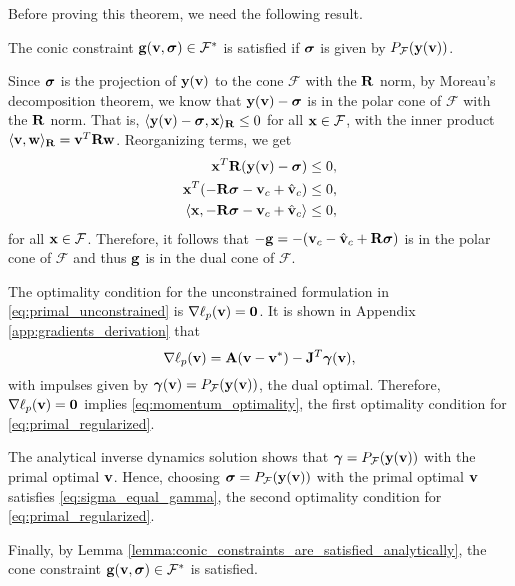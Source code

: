 Before proving this theorem, we need the following result.
\begin{lemma}
    The conic constraint ${\mathbf{g}}({\mathbf{v}}, {\bm\sigma})\in\mathcal{F}^*$ is satisfied
    if ${\bm\sigma}$ is given by $P_\mathcal{F}({\mathbf{y({\mathbf{v}})}})$.
    \label{lemma:conic_constraints_are_satisfied_analytically}
\end{lemma}
\begin{IEEEproof}
    Since ${\bm\sigma}$ is the projection of ${\mathbf{y}}({\mathbf{v}})$ to the cone
    $\mathcal{F}$ with the ${\mathbf{R}}$ norm, by Moreau's decomposition theorem, we
    know that ${\mathbf{y}}({\mathbf{v}}) - {\bm\sigma}$ is in the polar cone of $\mathcal{F}$
    with the ${\mathbf{R}}$ norm. That is, $\langle {\mathbf{y}}({\mathbf{v}}) - {\bm\sigma}, {\mathbf{x}} \rangle_{\mathbf{R}} \le 0$ for all ${\mathbf{x}} \in \mathcal{F}$, with the inner product
    $\langle{\mathbf{v}},{\mathbf{w}}\rangle_{\mathbf{R}}={\mathbf{v}}^T{\mathbf{R}}{\mathbf{w}}$. Reorganizing
    terms, we get
    \begin{align*}
        {\mathbf{x}}^T {\mathbf{R}}({\mathbf{y}}({\mathbf{v}}) - {\bm\sigma}) &\le 0, \\
        {\mathbf{x}}^T (-{\mathbf{R}}{\bm\sigma} - {\mathbf{v}}_c + \hat{{\mathbf{v}}}_c) &\le 0, \\
        \langle {\mathbf{x}}, -{\mathbf{R}}{\bm\sigma} - {\mathbf{v}}_c + \hat{{\mathbf{v}}}_c \rangle &\le 0,
    \end{align*}
    for all ${\mathbf{x}} \in \mathcal{F}$. Therefore, it follows that
    $-{\mathbf{g}}=-({\mathbf{v}}_c - \hat{{\mathbf{v}}}_c + {\mathbf{R}}{\bm\sigma})$ is in the polar cone
    of $\mathcal{F}$ and thus ${\mathbf{g}}$ is in the dual cone of $\mathcal{F}$.
\end{IEEEproof}

The optimality condition for the unconstrained formulation in
\eqref{eq:primal_unconstrained} is $\nabla\ell_p({\mathbf{v}})={\mathbf{0}}$. It is shown in
Appendix \ref{app:gradients_derivation} that
\begin{equation*}
    \nabla\ell_p({\mathbf{v}})={\mathbf{A}}({\mathbf{v}}-{\mathbf{v}}^*) - {\mathbf{J}}^T{\bm\gamma}({\mathbf{v}}),
\end{equation*}
with impulses given
by ${\bm\gamma}({\mathbf{v}})=P_\mathcal{F}({\mathbf{y}}({\mathbf{v}}))$, the dual optimal. Therefore,
$\nabla\ell_p({\mathbf{v}})={\mathbf{0}}$ implies \eqref{eq:momentum_optimality}, the first
optimality condition for \eqref{eq:primal_regularized}.
   
The analytical inverse dynamics solution shows that ${\bm\gamma} =
P_\mathcal{F}({\mathbf{y({\mathbf{v}})}})$ with the primal optimal ${\mathbf{v}}$. Hence, choosing
${\bm\sigma} = P_\mathcal{F}({\mathbf{y({\mathbf{v}})}})$ with the primal optimal ${\mathbf{v}}$
satisfies \eqref{eq:sigma_equal_gamma}, the second optimality condition for
\eqref{eq:primal_regularized}.

Finally, by Lemma \ref{lemma:conic_constraints_are_satisfied_analytically}, the
cone constraint ${\mathbf{g}}({\mathbf{v}}, {\bm\sigma})\in\mathcal{F}^*$ is satisfied.
\hfill\IEEEQED
